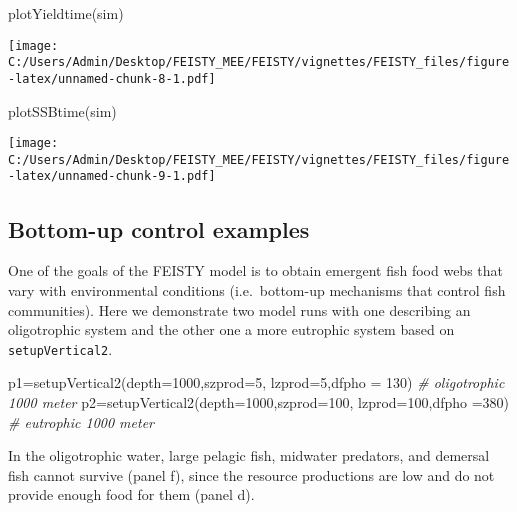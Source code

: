 \documentclass[
]{article}
\newenvironment{Shaded}{\begin{snugshade}}{\end{snugshade}}
\newcommand{\AttributeTok}[1]{\textcolor[rgb]{0.77,0.63,0.00}{#1}}
\newcommand{\CommentTok}[1]{\textcolor[rgb]{0.56,0.35,0.01}{\textit{#1}}}
\newcommand{\DecValTok}[1]{\textcolor[rgb]{0.00,0.00,0.81}{#1}}
\newcommand{\FunctionTok}[1]{\textcolor[rgb]{0.00,0.00,0.00}{#1}}
\newcommand{\NormalTok}[1]{#1}
\newcommand{\OtherTok}[1]{\textcolor[rgb]{0.56,0.35,0.01}{#1}}
\begin{document}
\begin{Shaded}
\begin{Highlighting}[]
\FunctionTok{plotYieldtime}\NormalTok{(sim)}
\end{Highlighting}
\end{Shaded}

\texttt{[image: C:/Users/Admin/Desktop/FEISTY\_MEE/FEISTY/vignettes/FEISTY\_files/figure-latex/unnamed-chunk-8-1.pdf]}

\begin{Shaded}
\begin{Highlighting}[]
\FunctionTok{plotSSBtime}\NormalTok{(sim)}
\end{Highlighting}
\end{Shaded}

\texttt{[image: C:/Users/Admin/Desktop/FEISTY\_MEE/FEISTY/vignettes/FEISTY\_files/figure-latex/unnamed-chunk-9-1.pdf]}

\hypertarget{bottom-up-control-examples}{%
\subsection{Bottom-up control
examples}\label{bottom-up-control-examples}}

One of the goals of the FEISTY model is to obtain emergent fish food
webs that vary with environmental conditions (i.e.~bottom-up mechanisms
that control fish communities). Here we demonstrate two model runs with
one describing an oligotrophic system and the other one a more eutrophic
system based on \texttt{setupVertical2}.

\begin{Shaded}
\begin{Highlighting}[]
\NormalTok{p1}\OtherTok{=}\FunctionTok{setupVertical2}\NormalTok{(}\AttributeTok{depth=}\DecValTok{1000}\NormalTok{,}\AttributeTok{szprod=}\DecValTok{5}\NormalTok{, }\AttributeTok{lzprod=}\DecValTok{5}\NormalTok{,}\AttributeTok{dfpho =} \DecValTok{130}\NormalTok{) }\CommentTok{\# oligotrophic 1000 meter}
\NormalTok{p2}\OtherTok{=}\FunctionTok{setupVertical2}\NormalTok{(}\AttributeTok{depth=}\DecValTok{1000}\NormalTok{,}\AttributeTok{szprod=}\DecValTok{100}\NormalTok{, }\AttributeTok{lzprod=}\DecValTok{100}\NormalTok{,}\AttributeTok{dfpho =}\DecValTok{380}\NormalTok{) }\CommentTok{\# eutrophic 1000 meter}
\end{Highlighting}
\end{Shaded}

In the oligotrophic water, large pelagic fish, midwater predators, and
demersal fish cannot survive (panel f), since the resource productions
are low and do not provide enough food for them (panel d).
\end{document}
